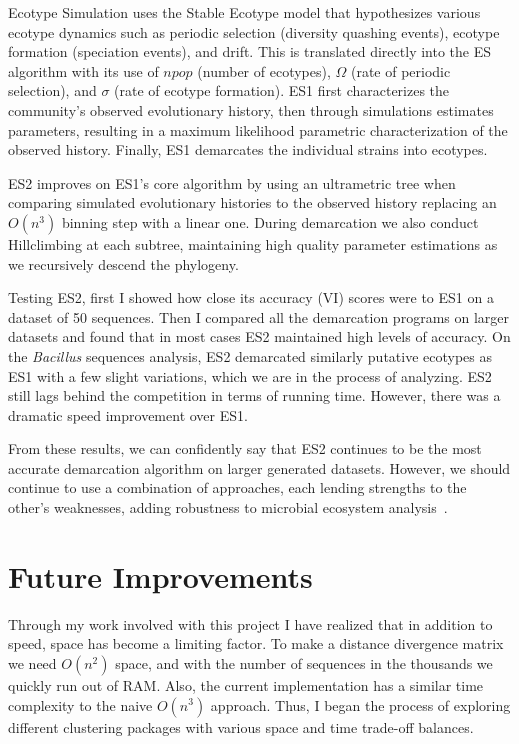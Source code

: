 Ecotype Simulation uses the Stable Ecotype model that hypothesizes various ecotype dynamics such as periodic selection (diversity quashing events), ecotype formation (speciation events), and drift.
This is translated directly into the ES algorithm with its use of $npop$ (number of ecotypes), $\Omega$ (rate of periodic selection), and $\sigma$ (rate of ecotype formation).
ES1 first characterizes the community's observed evolutionary history, then through simulations estimates parameters, resulting in a maximum likelihood parametric characterization of the observed history.
Finally, ES1 demarcates the individual strains into ecotypes.

ES2 improves on ES1's core algorithm by using an ultrametric tree when comparing simulated evolutionary histories to the observed history replacing an $O(n^3)$ binning step with a linear one.
During demarcation we also conduct Hillclimbing at each subtree, maintaining high quality parameter estimations as we recursively descend the phylogeny.

Testing ES2, first I showed how close its accuracy (VI) scores were to ES1 on a dataset of 50 sequences.
Then I compared all the demarcation programs on larger datasets and found that in most cases ES2 maintained high levels of accuracy.
On the \emph{Bacillus} sequences analysis, ES2 demarcated similarly putative ecotypes as ES1 with a few slight variations, which we are in the process of analyzing.
ES2 still lags behind the competition in terms of running time.
However, there was a dramatic speed improvement over ES1.

From these results, we can confidently say that ES2 continues to be the most accurate demarcation algorithm on larger generated datasets. However, we should continue to use a combination of approaches, each lending strengths to the other's weaknesses, adding robustness to microbial ecosystem analysis~\cite{bohannan2003new}.



\section{Future Improvements}
Through my work involved with this project I have realized that in addition to speed, space has become a limiting factor.
To make a distance divergence matrix we need $O(n^2)$ space, and with the number of sequences in the thousands we quickly run out of RAM.
Also, the current implementation has a similar time complexity to the naive $O(n^3)$ approach.
Thus, I began the process of exploring different clustering packages with various space and time trade-off balances.


